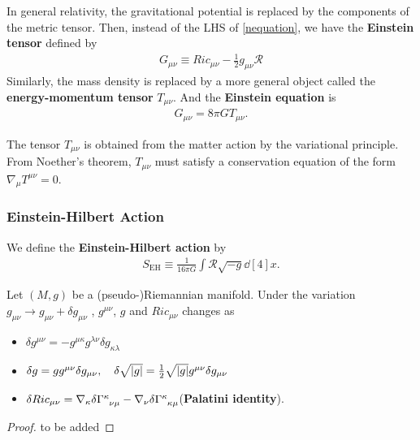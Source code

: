 \documentclass[10pt]{article}
\begin{document}
In general relativity, the gravitational potential is replaced by the components of the metric tensor.
Then, instead of the LHS of \cref{nequation}, we have the \textbf{Einstein tensor} defined by
\begin{align}
    G_{\mu\nu}\equiv Ric_{\mu\nu}-\frac{1}{2}g_{\mu\nu}\mathcal{R}
\end{align}
Similarly, the mass density is replaced by a more general object called the \textbf{energy-momentum tensor} $T_{\mu\nu}$.
And the \textbf{Einstein equation} is 
\begin{align}\label{einsteinequation}
    G_{\mu\nu}=8\pi GT_{\mu\nu}.
\end{align}
\begin{remark}
    The tensor $T_{\mu\nu}$ is obtained from the matter action by the variational principle.
    From Noether's theorem, $T_{\mu\nu}$ must satisfy a conservation equation of the form $\nabla_{\mu}T^{\mu\nu}=0$.
\end{remark}

\subsubsection{Einstein-Hilbert Action}
We define the \textbf{Einstein-Hilbert action} by
\begin{align}
    S_{\text{EH}}\equiv\frac{1}{16\pi G}\int\mathcal{R}\sqrt{-g}\dd[4]{x}.
\end{align}
\begin{proposition}
    Let $(M,g)$ be a (pseudo-)Riemannian manifold.
    Under the variation $g_{\mu\nu}\to g_{\mu\nu}+\delta g_{\mu\nu}$ , $g^{\mu\nu}$, $g$ and $Ric_{\mu\nu}$ changes as
    \begin{itemize}
        \item $\delta g^{\mu\nu}=-g^{\mu\kappa}g^{\lambda\nu}\delta g_{\kappa\lambda}$
        \item $\delta g=gg^{\mu\nu}\delta g_{\mu\nu}\qc \delta\sqrt{\abs{g}}=\frac{1}{2}\sqrt{\abs{g}}g^{\mu\nu}\delta g_{\mu\nu}$
        \item $\delta Ric_{\mu\nu}=\nabla_{\kappa}\delta\tensor{\Gamma}{^\kappa_\nu_\mu}-\nabla_\nu\delta\tensor{\Gamma}{^\kappa_\kappa_\mu}$\quad(\textbf{Palatini identity}).
    \end{itemize}
\end{proposition}
\begin{proof}
    to be added
\end{proof}
\end{document}

